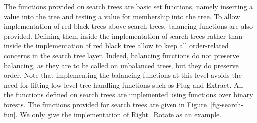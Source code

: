 \documentclass[11pt,a4paper]{article}
\begin{document}
The functions provided on search trees are basic set functions, namely inserting a value into the tree
and testing a value for membership into the tree. To allow implementation of red black trees above
search trees, balancing functions are also provided. Defining them inside the implementation of
search trees rather than inside the implementation of red black tree allow to keep all order-related
concerns in the search tree layer. Indeed, balancing functions do not preserve balancing, as they
are to be called on unbalanced trees, but they do preserve order. Note that implementing the balancing
functions at this level avoids the need for lifting low level tree handling functions such as Plug and
Extract. All the functions defined on search trees are implemented using
functions over binary forests. The functions provided for search trees are given in
Figure~\ref{fig-search-fun}. We only give the implementation of Right\_Rotate as an
example.
\end{document}
